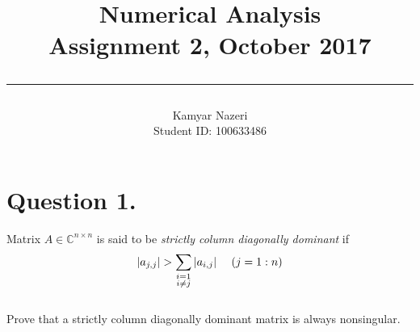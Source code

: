 \documentclass[a4paper,11pt]{article}
\newcommand\tab[1][4mm]{\hspace*{#1}}
\newcommand{\abs}[1]{\left\vert #1 \right\vert}
\begin{document}
\title{
	\Huge \textbf {Numerical Analysis}
    \\ [0.2cm]
	\LARGE Assignment 2, October 2017
    \\ [0.5cm]
    \hrule
}

\date{}

\author{
		\Large Kamyar Nazeri \\
		\large Student ID: 100633486 }

\maketitle

\newpage

\section*{Question 1.}
Matrix $A \in \mathbb{C}^{n\times n}$ is said to be \textit{strictly column diagonally dominant} if
\begin{equation}
\abs{a_{j,j}} > \sum_{\substack{i=1 \\ i\neq j}} \abs{a_{i,j}} \tab (j=1:n)
\end{equation}
\\
Prove that a strictly column diagonally dominant matrix is always nonsingular.
\\
\end{document}
